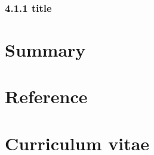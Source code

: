 \documentclass[a4paper, 14pt, UTF8, openright]{book}
\begin{document}
\subsection{4.1.1 title}
\lipsum[1-5]

\chapter{Summary}
\lipsum[1-5]

\chapter{Reference}

\chapter*{Curriculum vitae}
\lipsum[1-5]
	
\end{document}

